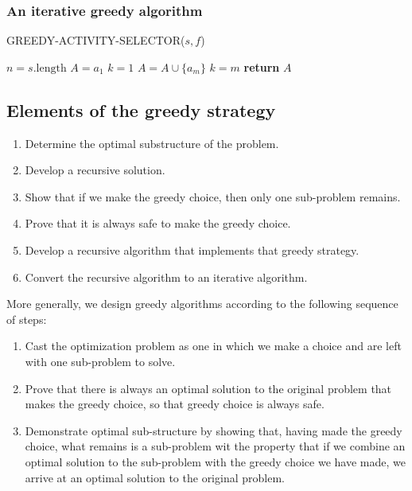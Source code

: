 \documentclass[12pt]{article}
\begin{document}
\subsubsection*{An iterative greedy algorithm}

GREEDY-ACTIVITY-SELECTOR($s, f$)
\begin{algorithmic}[1]
\State $n = s. \text{length}$
\State $A = {a_1}$
\State $k = 1$
		\State $A = A \cup \{ a_m \}$
                \State $k = m$
	\EndIf
\EndFor
\State \textbf{return } $A$
\end{algorithmic}

\subsection{Elements of the greedy strategy}

\begin{enumerate}
  \item Determine the optimal substructure of the problem.
  \item Develop a recursive solution.
  \item Show that if we make the greedy choice, then only one sub-problem remains.
  \item Prove that it is always safe to make the greedy choice.
  \item Develop a recursive algorithm that implements that greedy strategy.
  \item Convert the recursive algorithm to an iterative algorithm.
\end{enumerate}

More generally, we design greedy algorithms according to the following sequence of steps:

\begin{enumerate}
  \item Cast the optimization problem as one in which we make a choice and are left with one sub-problem to solve.
  \item Prove that there is always an optimal solution to the original problem that makes the greedy choice, so that greedy choice is always safe.
  \item Demonstrate optimal sub-structure by showing that, having made the greedy choice, what remains is a sub-problem wit the property that if we combine an optimal solution to the sub-problem with the greedy choice we have made, we arrive at an optimal solution to the original problem.
\end{enumerate}
\end{document}
